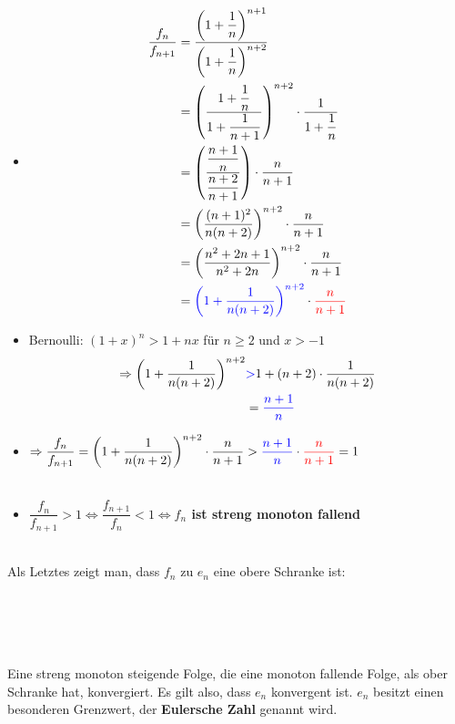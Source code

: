 \begin{itemize}
\item\begin{align*}\dfrac{f_{n}}{f_{n+1}}&=\dfrac{\left(1+\dfrac{1}{n}\right)^{n+1}}{\left(1+\dfrac{1}{n}\right)^{n+2}}\\
&=\left(\dfrac{1+\dfrac{1}{n}}{1+\dfrac{1}{n+1}}\right)^{n+2}\cdot\dfrac{1}{1+\dfrac{1}{n}}\\
&=\left(\dfrac{\dfrac{n+1}{n}}{\dfrac{n+2}{n+1}}\right)\cdot\dfrac{n}{n+1}\\
&=\left(\dfrac{(n+1)^2}{n(n+2)}\right)^{n+2}\cdot\dfrac{n}{n+1}\\
&=\left(\dfrac{n^2+2n+1}{n^2+2n}\right)^{n+2}\cdot\dfrac{n}{n+1}\\
&=\textcolor{blue}{\left(1+\dfrac{1}{n(n+2)}\right)^{n+2}}\cdot\textcolor{red}{\dfrac{n}{n+1}}
\end{align*}

\item Bernoulli: $(1+x)^n>1+nx$ für $n\geq2$ und $x>-1$\\
\begin{align*}\Rightarrow\left(1+\dfrac{1}{n(n+2)}\right)^{n+2}&\textcolor{blue}{>}1+(n+2)\cdot\dfrac{1}{n(n+2)}\\
&=\textcolor{blue}{\dfrac{n+1}{n}}
\end{align*}

\item$\Rightarrow\dfrac{f_n}{f_{n+1}}=\left(1+\dfrac{1}{n(n+2)}\right)^{n+2}\cdot\dfrac{n}{n+1}>\textcolor{blue}{\dfrac{n+1}{n}}\cdot\textcolor{red}{\dfrac{n}{n+1}}=1$
\\\\
\item $\dfrac{f_n}{f_{n+1}}>1\Leftrightarrow\dfrac{f_{n+1}}{f_{n}}<1$\textbf{$\Leftrightarrow f_n$ ist streng monoton fallend}
\\\\
\end{itemize}
Als Letztes zeigt man, dass $f_n$ zu $e_n$ eine obere Schranke ist:\\\\
\begin{array}{rccc}
&\left(1+\right)^{n+1}&>&\left(1+\right)^n}\\
\Leftrightarrow&f_n&>&e_n
\end{array}
\\\\\\
Eine streng monoton steigende Folge, die eine monoton fallende Folge, als ober Schranke hat, konvergiert. Es gilt also, dass $e_n$ konvergent ist. $e_n$ besitzt einen besonderen Grenzwert, der \textbf{Eulersche Zahl} genannt wird.
\newpage

